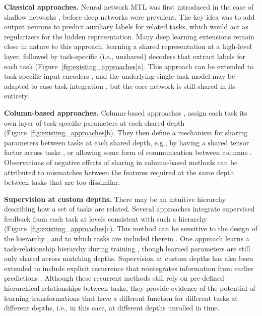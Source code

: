 \documentclass{article}
\theoremstyle{definition}
\theoremstyle{remark}
\begin{document}
\textbf{Classical approaches.}
Neural network MTL was first introduced in the case of shallow networks \citep{Caruana:1998}, before deep networks were prevalent.
The key idea was to add output neurons to predict auxiliary labels for related tasks, which would act as regularizers for the hidden representation.
Many deep learning extensions remain close in nature to this approach, learning a shared representation at a high-level layer, followed by task-specific (i.e., unshared) decoders that extract labels for each task \citep{Devin:2016,Dong:2015,Huang:2013,Huang:2015,Jaderberg:2016,Liu:2015,Ranjan:2016,Wu:2015,Zhang:2014} (Figure~\ref{fig:existing_approaches}a).
This approach can be extended to task-specific input encoders \citep{Devin:2016,Luong:2016}, 
and the underlying single-task model may be adapted to ease task integration \citep{Ranjan:2016,Wu:2015}, but the core network is still shared in its entirety.

\textbf{Column-based approaches.}
Column-based approaches \citep{Jou:2016,Misra:2016,Rusu:2016,Yang:2017}, assign each task its own layer of task-specific parameters at each shared depth (Figure~\ref{fig:existing_approaches}b). 
They then define a mechanism for sharing parameters between tasks at each shared depth, e.g., by having a shared tensor factor across tasks \citep{Yang:2017}, or allowing some form of communication between columns \citep{Jou:2016,Misra:2016,Rusu:2016}.
Observations of negative effects of sharing in column-based methods \citep{Rusu:2016} can be attributed to mismatches between the features required at the same depth between tasks that are too dissimilar. 

\textbf{Supervision at custom depths.}
There may be an intuitive hierarchy describing how a set of tasks are related.
Several approaches integrate supervised feedback from each task at levels consistent with such a hierarchy \citep{Hashimoto:2016,Toshniwal:2017,Zhang:2016} (Figure~\ref{fig:existing_approaches}c).
This method can be sensitive to the design of the hierarchy \citep{Toshniwal:2017}, and to which tasks are included therein \citep{Hashimoto:2016}.
One approach learns a task-relationship hierarchy during training \citep{Lu:2016}, though learned parameters are still only shared across matching depths.
Supervision at custom depths has also been extended to include explicit recurrence that reintegrates information from earlier predictions \citep{Bilen:2016,Zamir:2016}. 
Although these recurrent methods still rely on pre-defined hierarchical relationships between tasks, they provide evidence of the potential of learning transformations that have a different function for different tasks at different depths, i.e., in this case, at different depths unrolled in time.
\end{document}
